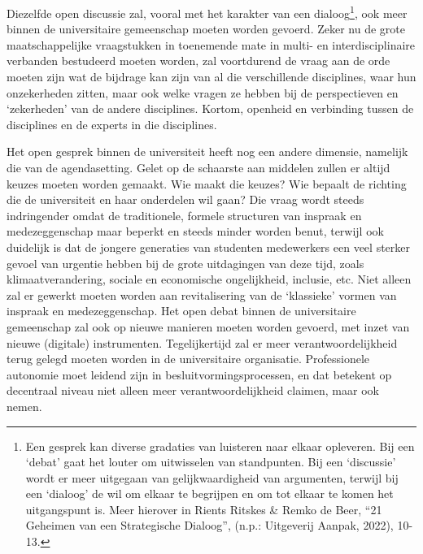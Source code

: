 \documentclass{jote-book}
\begin{document}
	Diezelfde open discussie zal, vooral met het karakter van een dialoog\footnote{Een gesprek kan diverse gradaties van luisteren naar elkaar opleveren. Bij een ‘debat' gaat het louter om uitwisselen van standpunten. Bij een ‘discussie' wordt er meer uitgegaan van gelijkwaardigheid van argumenten, terwijl bij een ‘dialoog' de wil om elkaar te begrijpen en om tot elkaar te komen het uitgangspunt is. Meer hierover in Rients Ritskes \& Remko de Beer, “21 Geheimen van een Strategische Dialoog”, (n.p.: Uitgeverij Aanpak, 2022), 10-13.}, ook meer binnen de universitaire gemeenschap moeten worden gevoerd. Zeker nu de grote maatschappelijke vraagstukken in toenemende mate in multi- en interdisciplinaire verbanden bestudeerd moeten worden, zal voortdurend de vraag aan de orde moeten zijn wat de bijdrage kan zijn van al die verschillende disciplines, waar hun onzekerheden zitten, maar ook welke vragen ze hebben bij de perspectieven en ‘zekerheden' van de andere disciplines. Kortom, openheid en verbinding tussen de disciplines en de experts in die disciplines.



	Het open gesprek binnen de universiteit heeft nog een andere dimensie, namelijk die van de agendasetting. Gelet op de schaarste aan middelen zullen er altijd keuzes moeten worden gemaakt. Wie maakt die keuzes? Wie bepaalt de richting die de universiteit en haar onderdelen wil gaan? Die vraag wordt steeds indringender omdat de traditionele, formele structuren van inspraak en medezeggenschap maar beperkt en steeds minder worden benut, terwijl ook duidelijk is dat de jongere generaties van studenten medewerkers een veel sterker gevoel van urgentie hebben bij de grote uitdagingen van deze tijd, zoals klimaatverandering, sociale en economische ongelijkheid, inclusie, etc. Niet alleen zal er gewerkt moeten worden aan revitalisering van de ‘klassieke' vormen van inspraak en medezeggenschap. Het open debat binnen de universitaire gemeenschap zal ook op nieuwe manieren moeten worden gevoerd, met inzet van nieuwe (digitale) instrumenten. Tegelijkertijd zal er meer verantwoordelijkheid terug gelegd moeten worden in de universitaire organisatie. Professionele autonomie moet leidend zijn in besluitvormingsprocessen, en dat betekent op decentraal niveau niet alleen meer verantwoordelijkheid claimen, maar ook nemen.
\end{document}
